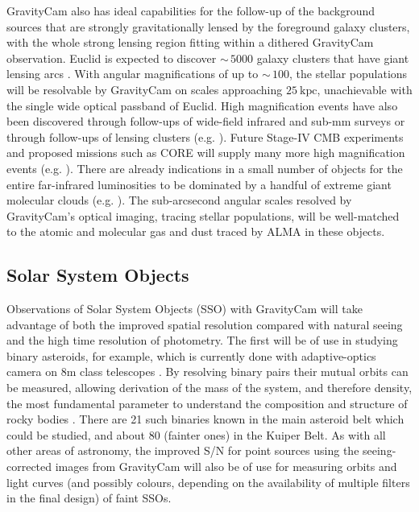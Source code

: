 \documentclass{pasa}%
\begin{document}
 \mbox{GravityCam}  also has ideal capabilities for the follow-up of the background sources that are strongly gravitationally lensed by the foreground galaxy clusters, with the whole strong lensing region fitting within a dithered  \mbox{GravityCam}  observation. Euclid is expected to discover $\sim\,5000$ galaxy clusters that have giant lensing arcs \citep{Euclid}. With angular magnifications of up to $\sim\,100$, the stellar populations will be resolvable by \mbox{GravityCam} on scales approaching $25~\mbox{kpc}$, unachievable with the single wide optical passband of Euclid. High magnification events have also been discovered through follow-ups of wide-field infrared and sub-mm surveys or through follow-ups of lensing clusters (e.g. \citealt{Swinbank2010,Iglesias-Groth2017,Canameras2015,DiazSanchez2017}). Future Stage-IV CMB experiments and proposed missions such as CORE will supply many more high magnification events (e.g. \citealt{DeZotti2016}). There are already indications in a small number of objects for the entire far-infrared luminosities to be dominated by a handful of extreme giant molecular clouds (e.g. \citealt{Swinbank2010}). The sub-arcsecond angular scales resolved by \mbox{GravityCam}'s optical imaging, tracing stellar populations, will be well-matched to the atomic and molecular gas and dust traced by ALMA in these objects. 



\subsection{Solar System Objects}
\label{Sect:SSO}

  Observations of Solar System Objects (SSO) with GravityCam will take
  advantage of both the improved spatial resolution compared with
  natural seeing and the high time resolution of photometry. The first
  will be of use in studying binary asteroids, for example, which is
  currently done with adaptive-optics camera on 8m class telescopes
  \citep[e.g.][]{Margot-Ast4}. By resolving binary pairs their mutual
  orbits can be measured, allowing derivation of the mass of the system,
  and therefore density, the most fundamental parameter to understand
  the composition and structure of rocky bodies \citep{Carry2012}. There
  are 
  21 such binaries known in the main asteroid belt which
  could be studied, and about 80 (fainter ones) in the Kuiper Belt. As
  with all other areas of astronomy, the improved S/N for point sources
  using the seeing-corrected images from GravityCam will also be of use
  for measuring orbits and light curves (and possibly colours, depending
  on the availability of multiple filters in the final design) of faint
  SSOs. 
\end{document}
